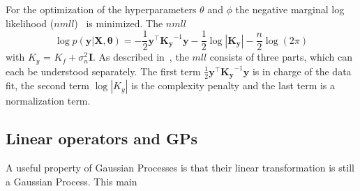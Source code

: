 \documentclass{article}
\begin{document}
For the optimization of the hyperparameters $\theta$ and $\phi$ the negative marginal log likelihood ($nmll$)~\cite{RasmussenCarlEdward} is minimized. The $nmll$ 
\begin{equation}
    \log p(\bm{y}|\bm{X},\bm{\theta}) = -\frac{1}{2}\bm{y}^\intercal \bm{K_y}^{-1}\bm{y} - \frac{1}{2}\log\left\lvert \bm{K_y}\right\rvert - \frac{n}{2}\log(2\pi)
\end{equation}
with $K_y$ = $K_f + \sigma_n^2 \bm{I}$. As described in~\cite{RasmussenCarlEdward}, the $mll$ consists of three parts, which can each be understood separately. The first term $\frac{1}{2}\bm{y}^\intercal \bm{K_y}^{-1}\bm{y}$ is in charge of the data fit, the second term $\log\left\lvert K_y\right\rvert$ is the complexity penalty and the last term is a normalization term. 

\subsection{Linear operators and GPs}
A useful property of Gaussian Processes is that their linear transformation is still a Gaussian Process. This main 
\end{document}
